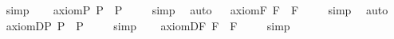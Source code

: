 \begin{isabellebody}
\isadelimproof
\ %
\endisadelimproof
%
\isatagproof
{}\isamarkupfalse%
\ simp\ \isamarkupfalse%
%
\endisatagproof
{\isafoldproof}%
%
\isadelimproof
%
\endisadelimproof
\isanewline
\isanewline
\ \isamarkupfalse%
\ axiom{\isacharunderscore}{}{\isacharunderscore}P{\isacharcolon}\ {\isachardoublequoteopen}{\isacharbrackleft}\isactrlbold {\isasymbox}{\isasymphi}\isactrlsup P\ \isactrlbold {\isasymrightarrow}\ \isactrlbold {\isasymdiamond}{\isasymphi}\isactrlsup P{\isacharbrackright}\ {\isacharequal}\ {\isasymtop}{\isachardoublequoteclose}%
\isadelimproof
\ %
\endisadelimproof
%
\isatagproof
{}\isamarkupfalse%
\ simp\ \isamarkupfalse%
\ auto%
\endisatagproof
{\isafoldproof}%
%
\isadelimproof
%
\endisadelimproof
\isanewline
\ \isamarkupfalse%
\ axiom{\isacharunderscore}{}{\isacharunderscore}F{\isacharcolon}\ {\isachardoublequoteopen}{\isacharbrackleft}\isactrlbold {\isasymbox}{\isasymphi}\isactrlsup F\ \isactrlbold {\isasymrightarrow}\ \isactrlbold {\isasymdiamond}{\isasymphi}\isactrlsup F{\isacharbrackright}\ {\isacharequal}\ {\isasymtop}{\isachardoublequoteclose}%
\isadelimproof
\ %
\endisadelimproof
%
\isatagproof
{}\isamarkupfalse%
\ simp\ \isamarkupfalse%
\ auto%
\endisatagproof
{\isafoldproof}%
%
\isadelimproof
%
\endisadelimproof
\isanewline
\isanewline
\ \isamarkupfalse%
\ axiom{\isacharunderscore}D{\isacharunderscore}P{\isacharcolon}\ {\isachardoublequoteopen}{\isacharbrackleft}\isactrlbold {\isasymbox}{\isasymphi}\isactrlsup P\ \isactrlbold {\isasymrightarrow}\ \isactrlbold {\isasymbox}\isactrlbold {\isasymbox}{\isasymphi}\isactrlsup P{\isacharbrackright}\ {\isacharequal}\ {\isasymtop}{\isachardoublequoteclose}%
\isadelimproof
\ %
\endisadelimproof
%
\isatagproof
{}\isamarkupfalse%
\ simp\ \isamarkupfalse%
%
\endisatagproof
{\isafoldproof}%
%
\isadelimproof
%
\endisadelimproof
\isanewline
\ \isamarkupfalse%
\ axiom{\isacharunderscore}D{\isacharunderscore}F{\isacharcolon}\ {\isachardoublequoteopen}{\isacharbrackleft}\isactrlbold {\isasymbox}{\isasymphi}\isactrlsup F\ \isactrlbold {\isasymrightarrow}\ \isactrlbold {\isasymbox}\isactrlbold {\isasymbox}{\isasymphi}\isactrlsup F{\isacharbrackright}\ {\isacharequal}\ {\isasymtop}{\isachardoublequoteclose}%
\isadelimproof
\ %
\endisadelimproof
%
\isatagproof
{}\isamarkupfalse%
\ simp\ \isamarkupfalse%
%
\endisatagproof
{\isafoldproof}%
%
\isadelimproof
%
\endisadelimproof

\end{isabellebody}
